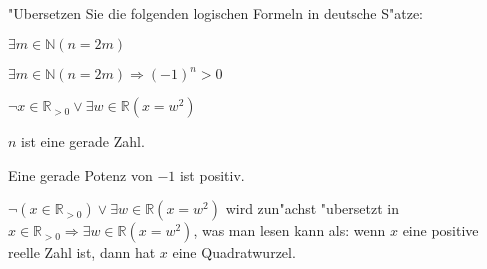 "Ubersetzen Sie die folgenden logischen Formeln in deutsche S"atze:
\begin{teilaufgaben}
\item $\exists m\in\mathbb N (n=2m)$
\item $\exists m\in\mathbb N (n=2m)\Rightarrow (-1)^n > 0$
\item $\neg x\in\mathbb R_{>0}\vee \exists w\in\mathbb R(x=w^2)$
\end{teilaufgaben}

\begin{loesung}
\begin{teilaufgaben}
\item $n$ ist eine gerade Zahl.
\item Eine gerade Potenz von $-1$ ist positiv.
\item $\neg (x\in\mathbb R_{>0})\vee \exists w\in\mathbb R(x=w^2)$ wird zun"achst
"ubersetzt in
$x\in\mathbb R_{>0}\Rightarrow \exists w\in\mathbb R(x=w^2)$, was man lesen
kann als: wenn $x$ eine positive reelle Zahl ist, dann hat $x$ eine
Quadratwurzel.
\end{teilaufgaben}
\end{loesung}

